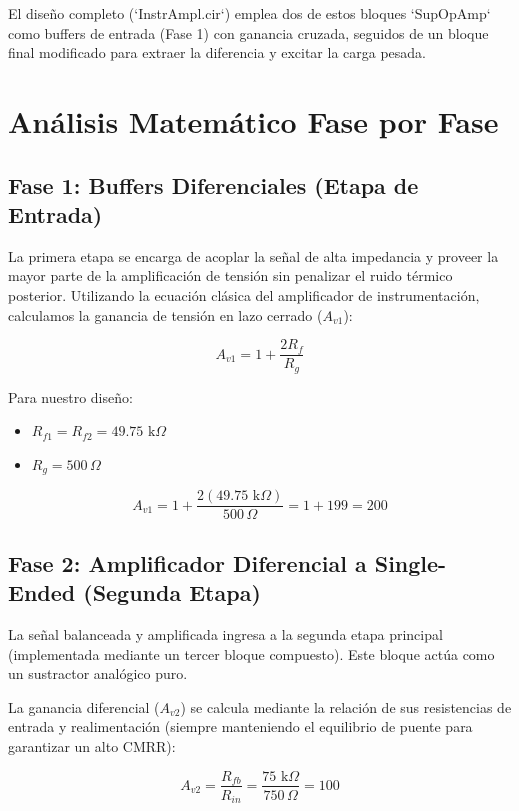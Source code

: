 \documentclass[11pt, a4paper]{article}
\begin{document}
El diseño completo (`InstrAmpl.cir`) emplea dos de estos bloques `SupOpAmp` como buffers de entrada (Fase 1) con ganancia cruzada, seguidos de un bloque final modificado para extraer la diferencia y excitar la carga pesada.

\newpage
\section{Análisis Matemático Fase por Fase}

\subsection{Fase 1: Buffers Diferenciales (Etapa de Entrada)}

La primera etapa se encarga de acoplar la señal de alta impedancia y proveer la mayor parte de la amplificación de tensión sin penalizar el ruido térmico posterior.
Utilizando la ecuación clásica del amplificador de instrumentación, calculamos la ganancia de tensión en lazo cerrado ($A_{v1}$):

\begin{equation}
A_{v1} = 1 + \frac{2 R_f}{R_g}
\end{equation}

Para nuestro diseño:
\begin{itemize}
    \item $R_{f1} = R_{f2} = 49.75\text{ k}\Omega$
    \item $R_g = 500\,\Omega$
\end{itemize}

\begin{equation}
A_{v1} = 1 + \frac{2(49.75\text{ k}\Omega)}{500\,\Omega} = 1 + 199 = 200
\end{equation}

\subsection{Fase 2: Amplificador Diferencial a Single-Ended (Segunda Etapa)}

La señal balanceada y amplificada ingresa a la segunda etapa principal (implementada mediante un tercer bloque compuesto). Este bloque actúa como un sustractor analógico puro.

La ganancia diferencial ($A_{v2}$) se calcula mediante la relación de sus resistencias de entrada y realimentación (siempre manteniendo el equilibrio de puente para garantizar un alto CMRR):

\begin{equation}
A_{v2} = \frac{R_{fb}}{R_{in}} = \frac{75\text{ k}\Omega}{750\,\Omega} = 100
\end{equation}
\end{document}
